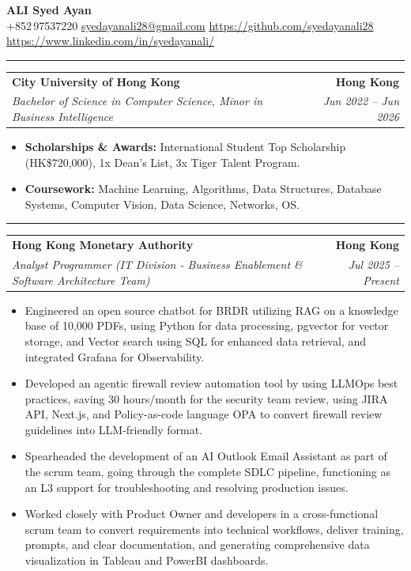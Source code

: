 \documentclass[9pt,a4paper]{article}
\makeatletter
\newcommand{\ressection}[1]{%
  \vspace{0.8em}%
  \noindent{\large\scshape\bfseries #1}\par\nobreak
  \vspace{-\parskip}%
  \noindent\rule{\linewidth}{0.1pt}\par\nobreak
  \vspace{-\parskip}%
}
\newcommand{\resumeSubheading}[4]{%
  \vspace{0.6em}%
  \begin{tabular*}{\textwidth}{l@{\extracolsep{\fill}}r}
    \textbf{#1} & \textbf{#2} \\
    \textit{\small #3} & \textit{\small #4} \\
  \end{tabular*}\vspace{0.32em}}
\makeatother
\begin{document}
\begin{center}
  {\LARGE\bfseries ALI Syed Ayan}\\[0.35em]
  \small
  +852\,97537220 \;\textbar\;
  \href{mailto:syedayanali28@gmail.com}{syedayanali28@gmail.com} \;\textbar\;
  \href{https://github.com/syedayanali28}{https://github.com/syedayanali28} \;\textbar\;
  \href{https://www.linkedin.com/in/syedayanali/}{https://www.linkedin.com/in/syedayanali/}
\end{center}
\vspace{0.55em}
\small

\ressection{Education}
\resumeSubheading{City University of Hong Kong}{Hong Kong}{Bachelor of Science in Computer Science, Minor in Business Intelligence}{Jun 2022 -- Jun 2026}
\begin{itemize}
  \item \textbf{Scholarships \& Awards:} International Student Top Scholarship (HK\$720{,}000), 1x Dean's List, 3x Tiger Talent Program.
  \item \textbf{Coursework:} Machine Learning, Algorithms, Data Structures, Database Systems, Computer Vision, Data Science, Networks, OS.
\end{itemize}

\ressection{Work Experience}

\resumeSubheading{Hong Kong Monetary Authority}{Hong Kong}{Analyst Programmer (IT Division - Business Enablement \& Software Architecture Team)}{Jul 2025 -- Present}
\begin{itemize}
  \item Engineered an open source chatbot for BRDR utilizing RAG on a knowledge base of 10{,}000 PDFs, using Python for data processing, pgvector for vector storage, and Vector search using SQL for enhanced data retrieval, and integrated Grafana for Observability.
  \item Developed an agentic firewall review automation tool by using LLMOps best practices, saving 30 hours/month for the security team review, using JIRA API, Next.js, and Policy-as-code language OPA to convert firewall review guidelines into LLM-friendly format.
  \item Spearheaded the development of an AI Outlook Email Assistant as part of the scrum team, going through the complete SDLC pipeline, functioning as an L3 support for troubleshooting and resolving production issues.
  \item Worked closely with Product Owner and developers in a cross-functional scrum team to convert requirements into technical workflows, deliver training, prompts, and clear documentation, and generating comprehensive data visualization in Tableau and PowerBI dashboards.
\end{itemize}
\end{document}
